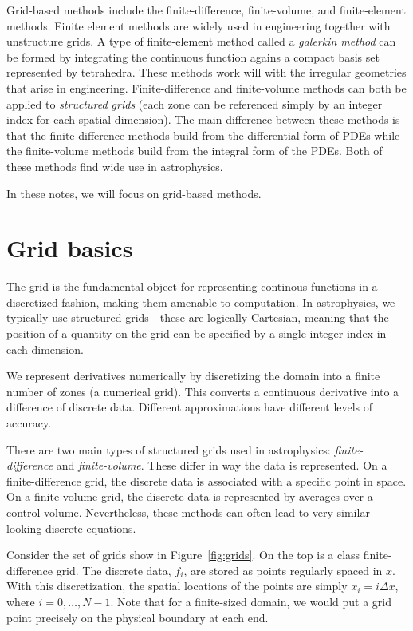 Grid-based methods include the finite-difference, finite-volume, and
finite-element methods.  Finite element methods are widely used in
engineering together with unstructure grids.  A type of finite-element
method called a {\em galerkin method} can be formed by integrating the
continuous function agains a compact basis set represented by
tetrahedra.  These methods work will with the irregular geometries
that arise in engineering.  Finite-difference and finite-volume
methods can both be applied to {\em structured grids} (each zone can
be referenced simply by an integer index for each spatial dimension).
The main difference between these methods is that the
finite-difference methods build from the differential form of PDEs
while the finite-volume methods build from the integral form of the
PDEs.  Both of these methods find wide use in astrophysics.

In these notes, we will focus on grid-based methods.


\section{Grid basics}

The grid is the fundamental object for representing continous
functions in a discretized fashion, making them amenable to
computation.  In astrophysics, we typically use structured
grids---these are logically Cartesian, meaning that the position of a
quantity on the grid can be specified by a single integer index in
each dimension.  

We represent derivatives numerically by discretizing the domain into
a finite number of zones (a numerical grid).
This converts a continuous derivative into a difference of discrete data.  
Different approximations have different levels of accuracy.  

There are two main types of structured grids used in astrophysics:
{\em finite-difference} and {\em finite-volume}.  These differ in way
the data is represented.  On a finite-difference grid, the discrete
data is associated with a specific point in space.  On a
finite-volume grid, the discrete data is represented by averages over
a control volume.  Nevertheless, these methods can often lead to very
similar looking discrete equations.

Consider the set of grids show in Figure~\ref{fig:grids}.  On the top
is a class finite-difference grid.  The discrete data, $f_i$, are
stored as points regularly spaced in $x$.  With this discretization,
the spatial locations of the points are simply $x_i = i \Delta x$,
where $i = 0, \ldots, N-1$.  Note that for a finite-sized domain, we
would put a grid point precisely on the physical boundary at each end.

